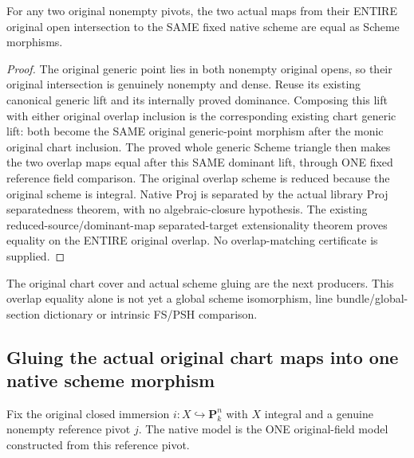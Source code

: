 \begin{theorem}
\label{thm:seven-fixed-original-native-chart-overlap-maps-route}
\leanok
{}
For any two original nonempty pivots, the two actual maps from their
ENTIRE original open intersection to the SAME fixed native scheme are
equal as Scheme morphisms.
\end{theorem}
\begin{proof}
The original generic point lies in both nonempty original opens, so their
original intersection is genuinely nonempty and dense. Reuse its existing
canonical generic lift and its internally proved dominance. Composing this
lift with either original overlap inclusion is the corresponding existing
chart generic lift: both become the SAME original generic-point morphism
after the monic original chart inclusion. The proved whole generic Scheme
triangle then makes the two overlap maps equal after this SAME dominant
lift, through ONE fixed reference field comparison. The original overlap
scheme is reduced because the original scheme is integral. Native Proj is
separated by the actual library Proj separatedness theorem, with no
algebraic-closure hypothesis. The existing reduced-source/dominant-map
separated-target extensionality theorem proves equality on the ENTIRE
original overlap. No overlap-matching certificate is supplied.
\end{proof}

The original chart cover and actual scheme gluing are the next producers.
This overlap equality alone is not yet a global scheme isomorphism, line
bundle/global-section dictionary or intrinsic FS/PSH comparison.

\subsection{Gluing the actual original chart maps into one native scheme morphism}
Fix the original closed immersion $i:X\hookrightarrow\mathbf P^n_k$ with
$X$ integral and a genuine nonempty reference pivot $j$. The native model
is the ONE original-field model constructed from this reference pivot.

